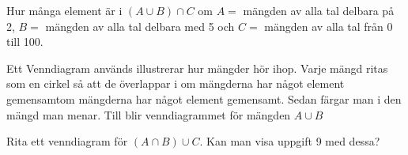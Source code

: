 \begin{problem}[Extra]
	Hur många element är i \((A \cup B) \cap C\) om \(A =\) mängden av alla tal delbara på 2, \(B = \) mängden av alla tal delbara med 5 och \(C =\) mängden av alla tal från 0 till 100.
\end{problem}

\begin{problem}
	Ett Venndiagram används illustrerar hur mängder hör ihop. Varje mängd ritas som en cirkel så att de överlappar i om mängderna har något element gemensamtom mängderna har något element gemensamt. Sedan färgar man i den mängd man menar. Till blir venndiagrammet för mängden \(A \cup B\)
	\def\firstcircle{(0,0) circle (1.5cm)}
	\def\secondcircle{(60:2cm) circle (1.5cm)}
	\def\thirdcircle{(0:2cm) circle (1.5cm)}
	\begin{center}
	\end{center}

	Rita ett venndiagram för \((A \cap B)\cup C\). Kan man visa uppgift 9 med dessa?
\end{problem}

